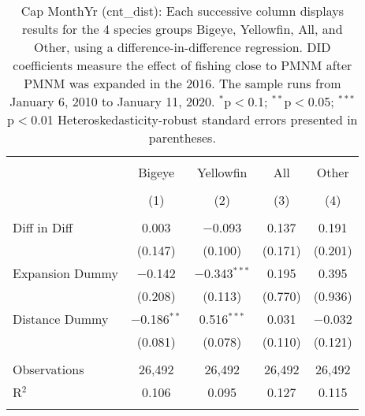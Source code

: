 
\begin{table}[!htbp] \centering 
  \caption{Cap MonthYr (cnt_dist): Each successive column displays results for the 4 species groups Bigeye, Yellowfin, All, and Other, using a difference-in-difference regression. DID coefficients measure the effect of fishing close to PMNM after PMNM was expanded in the 2016. The sample runs from January 6, 2010 to January 11, 2020. $^{*}$p$<$0.1; $^{**}$p$<$0.05; $^{***}$p$<$0.01 Heteroskedasticity-robust standard errors presented in parentheses.} 
  \label{tbl:timeFEcnt_dist} 
\begin{tabular}{@{\extracolsep{5pt}}lcccc} 
\\[-1.8ex]\hline 
\hline \\[-1.8ex] 
 & Bigeye & Yellowfin & All & Other \\ 
\\[-1.8ex] & (1) & (2) & (3) & (4)\\ 
\hline \\[-1.8ex] 
 Diff in Diff & 0.003 & $-$0.093 & 0.137 & 0.191 \\ 
  & (0.147) & (0.100) & (0.171) & (0.201) \\ 
  Expansion Dummy & $-$0.142 & $-$0.343$^{***}$ & 0.195 & 0.395 \\ 
  & (0.208) & (0.113) & (0.770) & (0.936) \\ 
  Distance Dummy & $-$0.186$^{**}$ & 0.516$^{***}$ & 0.031 & $-$0.032 \\ 
  & (0.081) & (0.078) & (0.110) & (0.121) \\ 
 \hline \\[-1.8ex] 
Observations & 26,492 & 26,492 & 26,492 & 26,492 \\ 
R$^{2}$ & 0.106 & 0.095 & 0.127 & 0.115 \\ 
\hline 
\hline \\[-1.8ex] 
\end{tabular} 
\end{table} 
